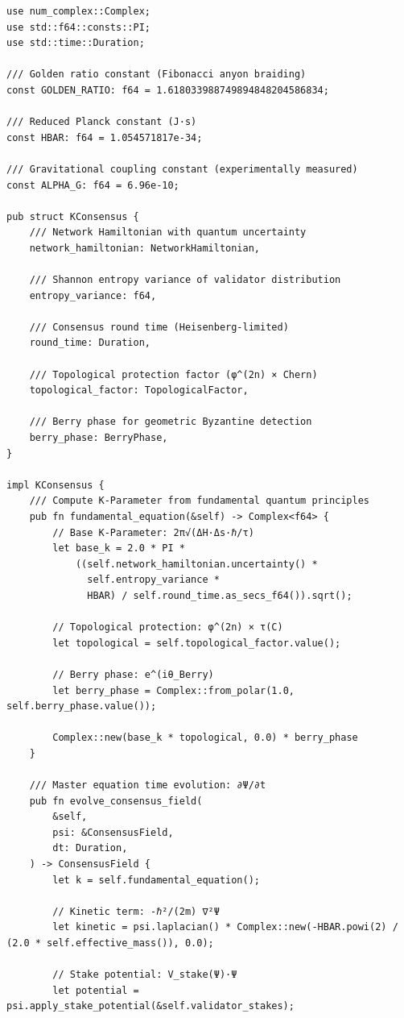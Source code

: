 \documentclass[11pt,a4paper]{article}
\begin{document}
\begin{lstlisting}
use num_complex::Complex;
use std::f64::consts::PI;
use std::time::Duration;

/// Golden ratio constant (Fibonacci anyon braiding)
const GOLDEN_RATIO: f64 = 1.618033988749894848204586834;

/// Reduced Planck constant (J·s)
const HBAR: f64 = 1.054571817e-34;

/// Gravitational coupling constant (experimentally measured)
const ALPHA_G: f64 = 6.96e-10;

pub struct KConsensus {
    /// Network Hamiltonian with quantum uncertainty
    network_hamiltonian: NetworkHamiltonian,

    /// Shannon entropy variance of validator distribution
    entropy_variance: f64,

    /// Consensus round time (Heisenberg-limited)
    round_time: Duration,

    /// Topological protection factor (φ^(2n) × Chern)
    topological_factor: TopologicalFactor,

    /// Berry phase for geometric Byzantine detection
    berry_phase: BerryPhase,
}

impl KConsensus {
    /// Compute K-Parameter from fundamental quantum principles
    pub fn fundamental_equation(&self) -> Complex<f64> {
        // Base K-Parameter: 2π√(ΔH·Δs·ℏ/τ)
        let base_k = 2.0 * PI *
            ((self.network_hamiltonian.uncertainty() *
              self.entropy_variance *
              HBAR) / self.round_time.as_secs_f64()).sqrt();

        // Topological protection: φ^(2n) × τ(C)
        let topological = self.topological_factor.value();

        // Berry phase: e^(iθ_Berry)
        let berry_phase = Complex::from_polar(1.0, self.berry_phase.value());

        Complex::new(base_k * topological, 0.0) * berry_phase
    }

    /// Master equation time evolution: ∂Ψ/∂t
    pub fn evolve_consensus_field(
        &self,
        psi: &ConsensusField,
        dt: Duration,
    ) -> ConsensusField {
        let k = self.fundamental_equation();

        // Kinetic term: -ℏ²/(2m) ∇²Ψ
        let kinetic = psi.laplacian() * Complex::new(-HBAR.powi(2) / (2.0 * self.effective_mass()), 0.0);

        // Stake potential: V_stake(Ψ)·Ψ
        let potential = psi.apply_stake_potential(&self.validator_stakes);


\end{lstlisting}
\end{document}
